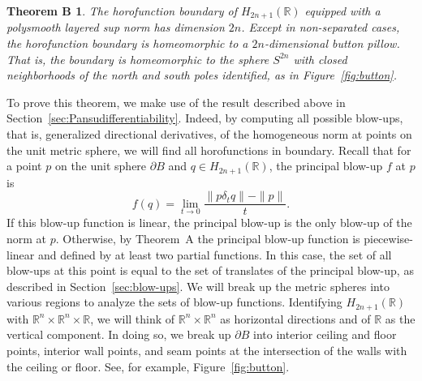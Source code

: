 \documentclass{article}
\newtheorem*{thmb}{Theorem B}{\bf}{\it}
\theoremstyle{definition}
\newcommand{\norm}[1]{\|#1\|}
\newcommand{\HHR}{H_{2n+1}(\mathbb{R})}
\newcommand{\R}{{\mathbb R}}
\begin{document}
\begin{thmb}\label{thm:thmb}
The horofunction boundary of $\HHR$ equipped with a polysmooth layered sup norm has dimension $2n$. Except in non-separated cases, the horofunction boundary is homeomorphic to a $2n$-dimensional button pillow. That is, the boundary is homeomorphic to the sphere $S^{2n}$ with closed neighborhoods of the north and south poles identified, as in Figure~\ref{fig:button}.
\end{thmb}

To prove this theorem, we make use of the result \cite{FNG} described above in Section~\ref{sec:Pansudifferentiability}. Indeed, by computing all possible blow-ups, that is, generalized directional derivatives, of the homogeneous norm at points on the unit metric sphere, we will find all horofunctions in boundary. Recall that for a point $p$ on the unit sphere $\partial B$ and $q \in \HHR$, the principal blow-up $f$ at $p$ is
\[
f(q) = \lim_{t\to0} \frac{\norm{p\delta_tq} - \norm{p}}{t}.
\]
If this blow-up function is linear, the principal blow-up is the only blow-up of the norm at $p$. Otherwise, by Theorem~A the principal blow-up function is piecewise-linear and defined by at least two partial functions. In this case, the set of all blow-ups at this point is equal to the set of translates of the principal blow-up, as described in Section~\ref{sec:blow-ups}. We will break up the metric spheres into various regions to analyze the sets of blow-up functions. Identifying $\HHR$ with $\R^n \times \R^n \times \R$, we will think of $\R^n \times \R^n$ as horizontal directions and of $\R$ as the vertical component. In doing so, we break up $\partial B$ into interior ceiling and floor points, interior wall points, and seam points at the intersection of the walls with the ceiling or floor. See, for example, Figure~\ref{fig:button}.
\end{document}

